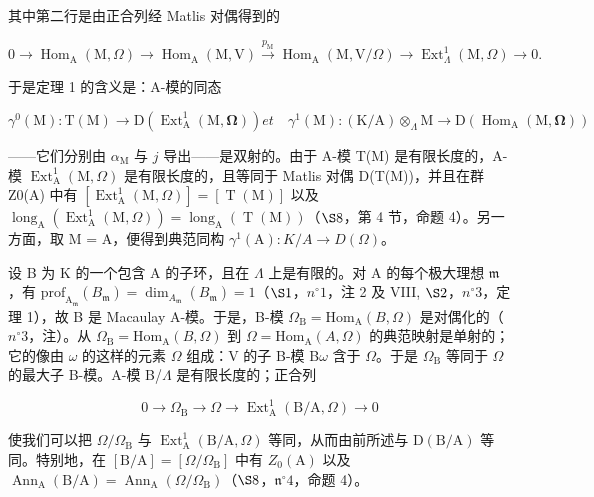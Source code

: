其中第二行是由正合列经 Matlis 对偶得到的

\[
0 \rightarrow \operatorname{Hom} _ {\mathrm{A}} (\mathrm{M}, \Omega) \longrightarrow \operatorname{Hom} _ {\mathrm{A}} (\mathrm{M}, \mathrm{V}) \xrightarrow {p _ {\mathrm{M}}} \operatorname{Hom} _ {\mathrm{A}} (\mathrm{M}, \mathrm{V} / \Omega) \longrightarrow \operatorname{Ext} _ {\Lambda} ^ {1} (\mathrm{M}, \Omega) \rightarrow 0.
\]

于是定理 1 的含义是：A-模的同态

\[
\gamma^ {0} (\mathrm{M}): \mathrm{T} (\mathrm{M}) \longrightarrow \mathrm{D} \left(\operatorname{Ext} _ {\mathrm{A}} ^ {1} (\mathrm{M}, \boldsymbol {\Omega})\right) e t \quad \gamma^ {1} (\mathrm{M}): (\mathrm{K} / \mathrm{A}) \otimes_ {\Lambda} \mathrm{M} \longrightarrow \mathrm{D} \left(\operatorname{Hom} _ {\mathrm{A}} (\mathrm{M}, \boldsymbol {\Omega})\right)
\]

——它们分别由 \(\alpha_{\mathrm{M}}\) 与 \(j\) 导出——是双射的。由于 A-模 T(M) 是有限长度的，A-模 \(\operatorname{Ext}_{\mathrm{A}}^{1}(\mathrm{M},\Omega)\) 是有限长度的，且等同于 Matlis 对偶 D(T(M))，并且在群 Z0(A) 中有 \([\operatorname{Ext}_{\mathrm{A}}^{1}(\mathrm{M},\Omega)] = [\operatorname{T}(\mathrm{M})]\) 以及 \(\operatorname{long}_{\mathrm{A}}(\operatorname{Ext}_{\mathrm{A}}^{1}(\mathrm{M},\Omega)) = \operatorname{long}_{\mathrm{A}}(\operatorname{T}(\mathrm{M}))\)（\(\S 8\)，第 4 节，命题 4）。另一方面，取 M = A，便得到典范同构 \(\gamma^{1}(\mathrm{A}):K / A\to D(\Omega)\)。

设 B 为 K 的一个包含 A 的子环，且在 \(\Lambda\) 上是有限的。对 A 的每个极大理想 \(\mathfrak{m}\)，有 \(\mathrm{prof}_{\mathrm{A}_{\mathfrak{m}}}(B_{\mathfrak{m}}) = \dim_{A_{\mathfrak{m}}}(B_{\mathfrak{m}}) = 1\)（\(\S 1\)，\(n^{\circ} 1\)，注 2 及 VIII, \(\S 2\)，\(n^{\circ} 3\)，定理 1），故 B 是 Macaulay A-模。于是，B-模 \(\Omega_{\mathrm{B}} = \mathrm{Hom}_{\mathrm{A}}(B, \Omega)\) 是对偶化的（\(n^{\circ} 3\)，注）。从 \(\Omega_{\mathrm{B}} = \mathrm{Hom}_{\mathrm{A}}(B, \Omega)\) 到 \(\Omega = \mathrm{Hom}_{\mathrm{A}}(A, \Omega)\) 的典范映射是单射的；它的像由 \(\omega\) 的这样的元素 \(\Omega\) 组成：V 的子 B-模 B\(\omega\) 含于 \(\Omega\)。于是 \(\Omega_{\mathrm{B}}\) 等同于 \(\Omega\) 的最大子 B-模。A-模 B/\(\Lambda\) 是有限长度的；正合列

\[
0 \to \Omega_ {\mathrm{B}} \to \Omega \to \operatorname{Ext} _ {\mathrm{A}} ^ {1} (\mathrm{B/A}, \Omega) \to 0
\]

使我们可以把 \(\Omega/\Omega_{\mathrm{B}}\) 与 \(\operatorname{Ext}_{\mathrm{A}}^{1}(\mathrm{B}/\mathrm{A},\Omega)\) 等同，从而由前所述与 \(\mathrm{D}(\mathrm{B}/\mathrm{A})\) 等同。特别地，在 \([\mathrm{B}/\mathrm{A}] = [\Omega/\Omega_{\mathrm{B}}]\) 中有 \(Z_{0}(\mathrm{A})\) 以及 \(\operatorname{Ann}_{\mathrm{A}}(\mathrm{B}/\mathrm{A}) = \operatorname{Ann}_{\mathrm{A}}(\Omega/\Omega_{\mathrm{B}})\)（\(\S 8\)，\(\mathfrak{n}^{\circ}4\)，命题 4）。

